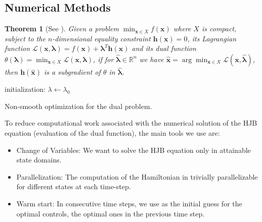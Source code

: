 \documentclass[ima, 20pt, portrait, plainboxedsections]{sciposter}
\newcommand{\R}{\mathbb{R}}
\newtheorem{Thm}{Theorem}
\begin{document}
\begin{multicols}{3}
\section*{Numerical Methods}
 
\begin{Thm}[See \cite{bazaraa2013nonlinear}] \label{theo_subgradient}
Given a problem $\min_{\bm{x}\in X}f(\bm{x})$ where $X$ is compact, subject to the $n$-dimensional equality constraint $\bm{h}(\bm{x})=0$, its Lagrangian function $\mathcal{L}(\bm{x},\bm{\lambda})=f(\bm{x})+\bm{\lambda}^T\bm{h}(\bm{x})$ and its dual function $\theta(\bm{\lambda})=\min_{\bm{x}\in X}\mathcal{L}(\bm{x},\bm{\lambda})$, if for $\hat{\bm{\lambda}}\in\R^n$ we have $\hat{\bm{x}}=\arg\min_{\bm{x}\in X}\mathcal{L}(\bm{x},\hat{\bm{\lambda}})$, then $\bm{h}(\hat{\bm{x}})$ is a subgradient of $\theta$ in $\hat{\bm{\lambda}}$.
\end{Thm} 
 
\begin{center}
\begin{minipage}{0.3\textwidth}
\begin{algorithm}[H]
\SetAlgoLined
initialization: $\lambda\leftarrow\lambda_0$\;\\
 \caption{Non-smooth optimization for the dual problem.}
\end{algorithm}
\end{minipage}
\end{center} 

To reduce computational work associated with the numerical solution of the HJB equation (evaluation of the dual function), the main tools we use are:
\begin{itemize}
\item {\color{red} Change of Variables}: We want to solve the HJB equation only in attainable state domains.
\item {\color{red} Parallelization}: The computation of the Hamiltonian in trivially parallelizable for different states at each time-step.
\item {\color{red} Warm start}: In consecutive time steps, we use as the initial guess for the optimal controls, the optimal ones in the previous time step.
\end{itemize}
 

\end{multicols}
\end{document}
